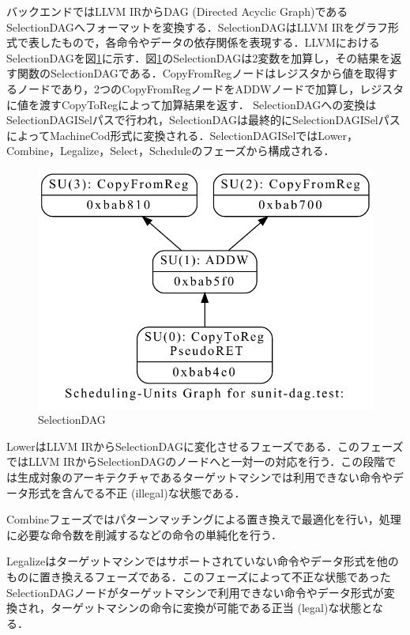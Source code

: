 バックエンドではLLVM IRからDAG (Directed Acyclic Graph)であるSelectionDAGへフォーマットを変換する．SelectionDAGはLLVM IRをグラフ形式で表したもので，各命令やデータの依存関係を表現する．LLVMにおけるSelectionDAGを図\ref{fig:dag}に示す．図\ref{fig:dag}のSelectionDAGは2変数を加算し，その結果を返す関数のSelectionDAGである．CopyFromRegノードはレジスタから値を取得するノードであり，2つのCopyFromRegノードをADDWノードで加算し，レジスタに値を渡すCopyToRegによって加算結果を返す．
SelectionDAGへの変換はSelectionDAGISelパスで行われ，SelectionDAGは最終的にSelectionDAGISelパスによってMachineCod形式に変換される．SelectionDAGISelではLower，Combine，Legalize，Select，Scheduleのフェーズから構成される．

\begin{figure}[tb]
    \centering
    \includegraphics[scale=0.6]{image/dag.pdf}
    \caption{SelectionDAG}
    \label{fig:dag}
\end{figure}

LowerはLLVM IRからSelectionDAGに変化させるフェーズである．このフェーズではLLVM IRからSelectionDAGのノードへと一対一の対応を行う．この段階では生成対象のアーキテクチャであるターゲットマシンでは利用できない命令やデータ形式を含んでる不正 (illegal)な状態である．

Combineフェーズではパターンマッチングによる置き換えで最適化を行い，処理に必要な命令数を削減するなどの命令の単純化を行う．

Legalizeはターゲットマシンではサポートされていない命令やデータ形式を他のものに置き換えるフェーズである．このフェーズによって不正な状態であったSelectionDAGノードがターゲットマシンで利用できない命令やデータ形式が変換され，ターゲットマシンの命令に変換が可能である正当 (legal)な状態となる．

